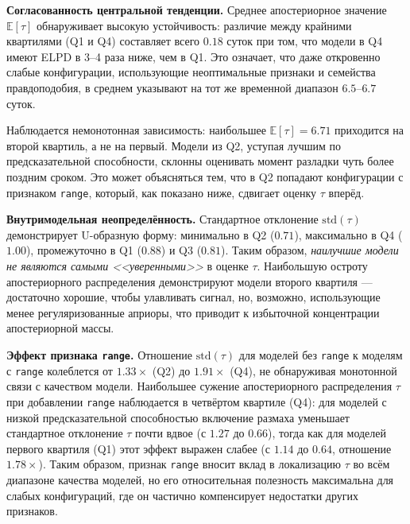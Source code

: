 \documentclass[14pt]{mmcs_article}
\begin{document}
\textbf{Согласованность центральной тенденции.}
Среднее апостериорное значение $\mathbb{E}[\tau]$ обнаруживает
высокую устойчивость: различие между крайними квартилями (Q1
и Q4) составляет всего $0.18$ суток при
том, что модели в Q4 имеют ELPD в 3--4 раза ниже, чем
в Q1. Это означает, что даже откровенно слабые конфигурации,
использующие неоптимальные признаки и семейства правдоподобия,
в среднем указывают на тот же временной диапазон $6.5$--$6.7$
суток.

Наблюдается немонотонная зависимость: наибольшее
$\mathbb{E}[\tau] = 6.71$ приходится на второй квартиль, а не
на первый. Модели из Q2, уступая лучшим по предсказательной
способности, склонны оценивать момент разладки чуть более
поздним сроком. Это может объясняться тем, что в Q2 попадают
конфигурации с признаком \texttt{range}, который, как показано
ниже, сдвигает оценку $\tau$ вперёд.

\textbf{Внутримодельная неопределённость.}
Стандартное отклонение $\mathrm{std}(\tau)$ демонстрирует
U-образную форму: минимально в Q2 ($0.71$), максимально в Q4
($1.00$), промежуточно в Q1 ($0.88$) и Q3 ($0.81$). Таким
образом, \textit{наилучшие модели не являются самыми
	<<уверенными>>} в оценке $\tau$. Наибольшую остроту
апостериорного распределения демонстрируют модели второго
квартиля — достаточно хорошие, чтобы улавливать сигнал, но,
возможно, использующие менее регуляризованные априоры, что
приводит к избыточной концентрации апостериорной массы.

\textbf{Эффект признака \texttt{range}.}
Отношение $\mathrm{std}(\tau)$ для моделей без \texttt{range}
к моделям с \texttt{range} колеблется от $1.33\times$ (Q2) до
$1.91\times$ (Q4), не обнаруживая монотонной связи с качеством
модели. Наибольшее сужение апостериорного распределения
$\tau$ при добавлении \texttt{range} наблюдается в четвёртом
квартиле (Q4): для моделей с низкой предсказательной
способностью включение размаха уменьшает стандартное
отклонение $\tau$ почти вдвое (с $1.27$ до $0.66$), тогда как
для моделей первого квартиля (Q1) этот эффект выражен слабее
(с $1.14$ до $0.64$, отношение $1.78\times$). Таким образом,
признак \texttt{range} вносит вклад в локализацию $\tau$ во
всём диапазоне качества моделей, но его относительная
полезность максимальна для слабых конфигураций, где он
частично компенсирует недостатки других признаков.
\end{document}
